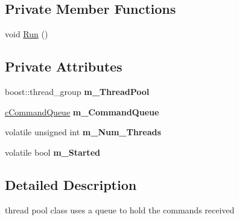 \subsection*{\-Private \-Member \-Functions}
\begin{DoxyCompactItemize}
\item 
void \hyperlink{classengine_1_1cThreadPool_af573f11026d6b6079c56af7e50df5ca6}{\-Run} ()
\end{DoxyCompactItemize}
\subsection*{\-Private \-Attributes}
\begin{DoxyCompactItemize}
\item 
\hypertarget{classengine_1_1cThreadPool_ae0439f245252951c72e929fcb5f12ea7}{boost\-::thread\-\_\-group {\bfseries m\-\_\-\-Thread\-Pool}}\label{classengine_1_1cThreadPool_ae0439f245252951c72e929fcb5f12ea7}

\item 
\hypertarget{classengine_1_1cThreadPool_a9e8295a610871d54220f068d447e4b3d}{\hyperlink{classengine_1_1cCommandQueue}{c\-Command\-Queue} {\bfseries m\-\_\-\-Command\-Queue}}\label{classengine_1_1cThreadPool_a9e8295a610871d54220f068d447e4b3d}

\item 
\hypertarget{classengine_1_1cThreadPool_a5a9ba1d9f84c6edf6312c358973c1e75}{volatile unsigned int {\bfseries m\-\_\-\-Num\-\_\-\-Threads}}\label{classengine_1_1cThreadPool_a5a9ba1d9f84c6edf6312c358973c1e75}

\item 
\hypertarget{classengine_1_1cThreadPool_a665b990bbfe85aa6dd9be2691373e2d7}{volatile bool {\bfseries m\-\_\-\-Started}}\label{classengine_1_1cThreadPool_a665b990bbfe85aa6dd9be2691373e2d7}

\end{DoxyCompactItemize}


\subsection{\-Detailed \-Description}
thread pool class uses a queue to hold the commands received 

